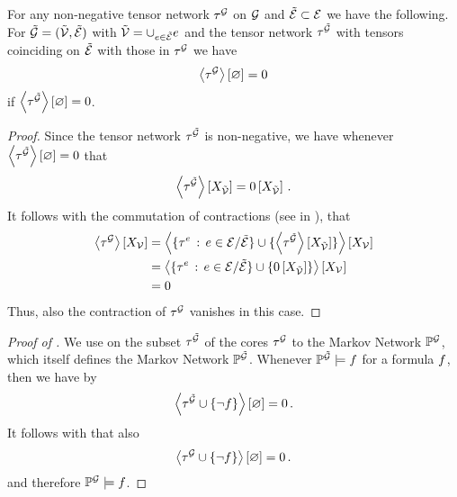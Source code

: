 \begin{lemma}
    \label{lem:monotocityOfVanishingContractions}
    For any non-negative tensor network $\tau^{\mathcal{G}}$ on $\mathcal{G}$ and $\tilde{\mathcal{E}}\subset\mathcal{E}$ we have the following.
    For $\tilde{\mathcal{G}}=(\tilde{\mathcal{V}},\tilde{\mathcal{E}})$ with $\tilde{\mathcal{V}}=\cup_{e\in\tilde{\mathcal{E}}}e$ and the tensor network $\tau^{\tilde{\mathcal{G}}}$ with tensors coinciding on $\tilde{\mathcal{E}}$ with those in $\tau^{\mathcal{G}}$ we have
    \begin{align*}
        \left\langle \tau^{\mathcal{G}}\right\rangle \left[ \varnothing \right] = 0
    \end{align*}
    if $\left\langle \tau^{\tilde{\mathcal{G}}}\right\rangle \left[ \varnothing \right]=0$.
\end{lemma}
\begin{proof}
    Since the tensor network $\tau^{\tilde{\mathcal{G}}}$ is non-negative, we have whenever $\left\langle \tau^{\tilde{\mathcal{G}}}\right\rangle \left[ \varnothing \right]=0$ that
    \begin{align*}
        \left\langle \tau^{\tilde{\mathcal{G}}}\right\rangle \left[ X_{\tilde{\mathcal{V}}} \right] = 0\left[X_{\tilde{\mathcal{V}}}\right] \, .
    \end{align*}
    It follows with the commutation of contractions (see  in ), that
    \begin{align*}
        \left\langle \tau^{\mathcal{G}}\right\rangle \left[ X_{\mathcal{V}} \right]
        &= \left\langle 
            \{\tau^{e} \,:\, e\in\mathcal{E}/\tilde{\mathcal{E}}\}
            \cup \{\left\langle \tau^{\tilde{\mathcal{G}}}\right\rangle \left[ X_{\tilde{\mathcal{V}}} \right]\}
        \right\rangle \left[ X_{\mathcal{V}} \right] \\
        &=    \left\langle 
            \{\tau^{e} \,:\, e\in\mathcal{E}/\tilde{\mathcal{E}}\}
            \cup \{0\left[X_{\tilde{\mathcal{V}}}\right]\}
        \right\rangle \left[ X_{\mathcal{V}} \right] \\
        &= 0
    \end{align*}
    Thus, also the contraction of $\tau^{\mathcal{G}}$ vanishes in this case.
\end{proof}

\begin{proof}[Proof of ]
    We use  on the subset $\tau^{\tilde{\mathcal{G}}}$ of the cores $\tau^{\mathcal{G}}$ to the Markov Network $\mathbb{P}^{\mathcal{G}}$, which itself defines the Markov Network $\mathbb{P}^{\tilde{\mathcal{G}}}$.
    Whenever $\mathbb{P}^{\tilde{\mathcal{G}}}\models f$ for a formula $f$, then we have by 
    \begin{align*}
        \left\langle \tau^{\tilde{\mathcal{G}}} \cup\{\lnot f\}\right\rangle \left[ \varnothing \right] = 0 \, .
    \end{align*}
    It follows with  that also
    \begin{align*}
        \left\langle \tau^{\mathcal{G}} \cup\{\lnot f\}\right\rangle \left[ \varnothing \right] = 0 \, .
    \end{align*}
    and therefore $\mathbb{P}^{\mathcal{G}}\models f$.
\end{proof}


